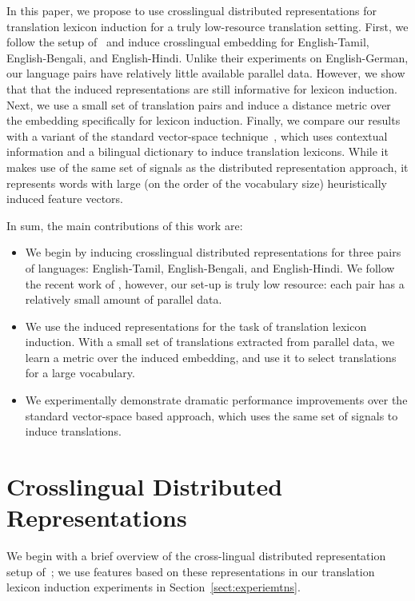 \documentclass[11pt,letterpaper]{article}
\newcommand{\secref}[1]{Section~\ref{#1}}
\begin{document}
In this paper, we propose to use crosslingual distributed representations for translation lexicon induction for a truly low-resource translation setting.  First, we follow the setup of~\cite{Klementiev-et-al:COLING2012} and induce crosslingual embedding for English-Tamil, English-Bengali, and English-Hindi.  Unlike their experiments on English-German, our language pairs have relatively little available parallel data.  However, we show that that the induced representations are still informative for lexicon induction.  Next, we use a small set of translation pairs and induce a distance metric over the embedding specifically for lexicon induction.  Finally, we compare our results with a variant of the standard vector-space technique~\cite{Fung:1998}, which uses contextual information and a bilingual dictionary to induce translation lexicons.  While it makes use of the same set of signals as the distributed representation approach, it represents words with large (on the order of the vocabulary size) heuristically induced feature vectors.

In sum, the main contributions of this work are:

\begin{itemize}
  \item We begin by inducing crosslingual distributed representations for three pairs of languages: English-Tamil, English-Bengali, and English-Hindi.  We follow the recent work of , however, our set-up is truly low resource: each pair has a relatively small amount of parallel data.
  \item We use the induced representations for the task of translation lexicon induction.  With a small set of translations extracted from parallel data, we learn a metric over the induced embedding, and use it to select translations for a large vocabulary.
  \item We experimentally demonstrate dramatic performance improvements over the standard vector-space based approach, which uses the same set of signals to induce translations.
\end{itemize}

\section{Crosslingual Distributed Representations} \label{sect:background}

We begin with a brief overview of the cross-lingual distributed representation setup of~; we use features based on these representations in our translation lexicon induction experiments in \secref{sect:experiemtns}. 
\end{document}
